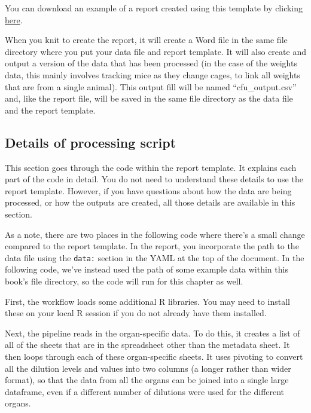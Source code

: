 \documentclass[
]{book}
\begin{document}
You can download an example of a report created using this template by
clicking \href{https://github.com/csu-impactb/CODING-TEAM-BOOKDOWN-/raw/main/templates/report_templates/cfu_report.docx}{here}.

When you knit to create the report, it will create a Word file in the
same file directory where you put your data file and report template.
It will also create and output a version of the data that has been
processed (in the case of the weights data, this mainly involves
tracking mice as they change cages, to link all weights that are from
a single animal). This output fill will be named ``cfu\_output.csv'' and, like
the report file, will be saved in the same file directory as the
data file and the report template.

\subsection{Details of processing script}\label{details-of-processing-script-1}

This section goes through the code within the report template. It
explains each part of the code in detail. You do not need to understand
these details to use the report template. However, if you have questions
about how the data are being processed, or how the outputs are created,
all those details are available in this section.

As a note, there are two places in the following code where there's a small
change compared to the report template. In the report, you incorporate the path
to the data file using the \texttt{data:} section in the YAML at the top of the
document. In the following code, we've instead used the path of some example
data within this book's file directory, so the code will run for this chapter as
well.

First, the workflow loads some additional R libraries. You may need to install
these on your local R session if you do not already have them installed.

Next, the pipeline reads in the organ-specific data. To do this, it creates a
list of all of the sheets that are in the spreadsheet other than the metadata
sheet. It then loops through each of these organ-specific sheets. It uses
pivoting to convert all the dilution levels and values into two columns
(a longer rather than wider format), so that the data from all the organs can
be joined into a single large dataframe, even if a different number of dilutions
were used for the different organs.
\end{document}
